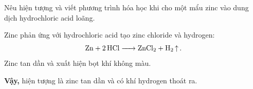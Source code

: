 \begin{tuluyen}
Nêu hiện tượng và viết phương trình hóa học khi cho một mẩu zinc vào dung dịch hydrochloric acid loãng.
\begin{loigiaiBT}
Zinc phản ứng với hydrochloric acid tạo zinc chloride và hydrogen:
\[
\ce{Zn + 2HCl -> ZnCl2 + H2 ^}.
\]
Zinc tan dần và xuất hiện bọt khí không màu.

\textbf{Vậy,} hiện tượng là zinc tan dần và có khí hydrogen thoát ra.
\end{loigiaiBT}
\end{tuluyen}
